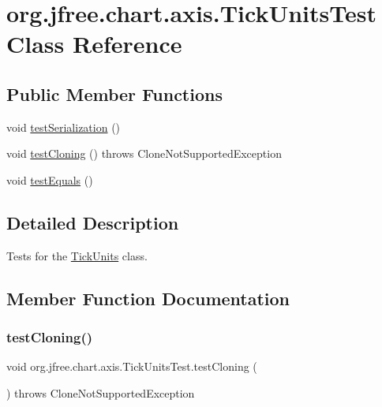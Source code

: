 \hypertarget{classorg_1_1jfree_1_1chart_1_1axis_1_1_tick_units_test}{}\section{org.\+jfree.\+chart.\+axis.\+Tick\+Units\+Test Class Reference}
\label{classorg_1_1jfree_1_1chart_1_1axis_1_1_tick_units_test}
\subsection*{Public Member Functions}
\begin{DoxyCompactItemize}
\item 
void \mbox{\hyperlink{classorg_1_1jfree_1_1chart_1_1axis_1_1_tick_units_test_a8a9fa7497269ec01bad15eed2f57df0f}{test\+Serialization}} ()
\item 
void \mbox{\hyperlink{classorg_1_1jfree_1_1chart_1_1axis_1_1_tick_units_test_a042b244af8df0eae1a57e337a1c7440b}{test\+Cloning}} ()  throws Clone\+Not\+Supported\+Exception 
\item 
void \mbox{\hyperlink{classorg_1_1jfree_1_1chart_1_1axis_1_1_tick_units_test_ac1366dd8eefdad4f330eb42c1216ab7e}{test\+Equals}} ()
\end{DoxyCompactItemize}


\subsection{Detailed Description}
Tests for the \mbox{\hyperlink{classorg_1_1jfree_1_1chart_1_1axis_1_1_tick_units}{Tick\+Units}} class. 

\subsection{Member Function Documentation}
\mbox{\label{classorg_1_1jfree_1_1chart_1_1axis_1_1_tick_units_test_a042b244af8df0eae1a57e337a1c7440b}} 
\subsubsection{\texorpdfstring{test\+Cloning()}{testCloning()}}
{\footnotesize\ttfamily void org.\+jfree.\+chart.\+axis.\+Tick\+Units\+Test.\+test\+Cloning (\begin{DoxyParamCaption}{ }\end{DoxyParamCaption}) throws Clone\+Not\+Supported\+Exception}

